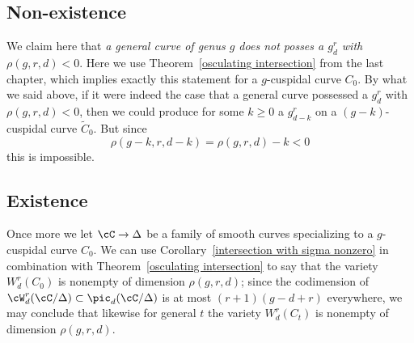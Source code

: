 \subsection{Non-existence}

We claim here that \emph{a general curve of genus $g$ does not posses a $g^r_d$ with $\rho(g,r,d) < 0$}.
Here we use Theorem~\ref{osculating intersection} from the last chapter, which implies exactly this statement for a $g$-cuspidal curve $C_0$. By what we said above, if it were indeed the case that a general curve possessed a $g^r_d$ with $\rho(g,r,d) < 0$, then we could produce for some $k \geq 0$ a $g^r_{d-k}$ on a $(g-k)$-cuspidal curve  $\tilde C_0$. But since
$$
\rho(g-k, r, d-k) = \rho(g,r,d) - k < 0
$$
this is impossible.

\subsection{Existence}

Once more we let $\cC \to \Delta$ be a family of smooth curves specializing to a $g$-cuspidal curve $C_0$. We can use Corollary~\ref{intersection with sigma nonzero} in combination with Theorem~\ref{osculating intersection} to say that the variety $W^r_d(C_0)$ is nonempty of dimension $\rho(g,r,d)$; since the codimension of $\cW^r_d(\cC/\Delta) \subset \pic_d(\cC/\Delta)$ is at most $(r+1)(g-d+r)$ everywhere, we may conclude that likewise for general $t$ the variety $W^r_d(C_t)$ is nonempty of dimension $\rho(g,r,d)$.


